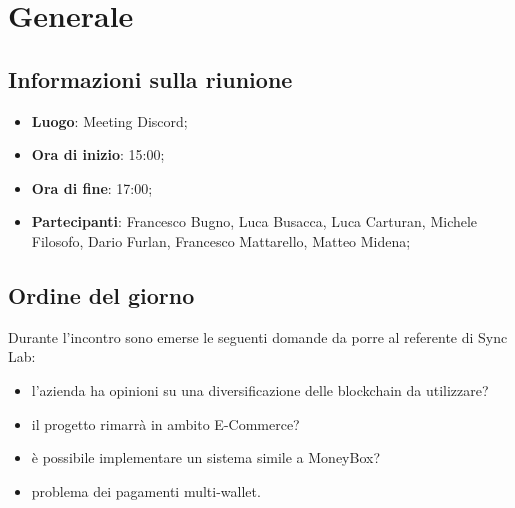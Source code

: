 \section{Generale}

\vspace{10pt}


\subsection{Informazioni sulla riunione}
\begin{itemize}
	\item \textbf{Luogo}: Meeting Discord;
	\item \textbf{Ora di inizio}: 15:00;
	\item \textbf{Ora di fine}: 17:00;
	\item \textbf{Partecipanti}: Francesco Bugno, Luca Busacca, Luca Carturan, Michele Filosofo, Dario Furlan, Francesco Mattarello, Matteo Midena;
\end{itemize}

\vspace{5pt}

\subsection{Ordine del giorno}
Durante l'incontro sono emerse le seguenti domande da porre al referente di Sync Lab:
\begin{itemize}
	\item l'azienda ha opinioni su una diversificazione delle blockchain\glo{} da utilizzare?
	\item il progetto rimarrà in ambito E-Commerce\glo?
	\item è possibile implementare un sistema simile a MoneyBox\glo?
	\item problema dei pagamenti multi-wallet\glo.
\end{itemize}
